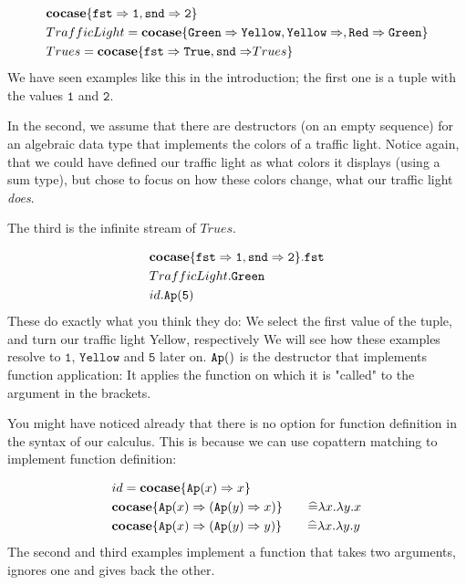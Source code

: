 \documentclass[twoside,12pt,a4paper]{article}
\begin{document}
\begin{example}
    \begin{align*}
        &\textbf{cocase}\{\mathtt{fst\Rightarrow 1, snd\Rightarrow 2}\}\\
        &TrafficLight = \textbf{cocase}\{\mathtt{Green \Rightarrow Yellow, Yellow\Rightarrow, Red\Rightarrow Green}\}\\
        &Trues = \textbf{cocase}\{\mathtt{fst \Rightarrow True, snd\Rightarrow}Trues\} 
    \end{align*}
    We have seen examples like this in the introduction; the first one is a tuple with the values $\mathtt{1}$ and $\mathtt{2}$.

    In the second, we assume that there are destructors (on an empty sequence) for an algebraic data type that implements the colors of a traffic light.
    Notice again, that we could have defined our traffic light as what colors it displays (using a sum type), but chose to focus on how these colors change, 
    what our traffic light \textit{does}.

    The third is the infinite stream of $Trues$.
\end{example}

\begin{example}
    \begin{align*}
        &\textbf{cocase}\{\mathtt{fst\Rightarrow 1, snd\Rightarrow 2}\}.\mathtt{fst}\\
        &TrafficLight.\mathtt{Green}\\
        &id.\texttt{Ap}(\mathtt{5})
    \end{align*}
    These do exactly what you think they do: We select the first value of the tuple,
    and turn our traffic light Yellow, respectively 
    We will see how these examples resolve to $\mathtt{1}$, $\mathtt{Yellow}$ and $\mathtt{5}$ later on. %
    $\texttt{Ap}()$ is the destructor that implements function application: It applies the function on which it is "called" to the argument in the brackets.
\end{example} 

You might have noticed already that there is no option for function definition in the syntax of our calculus.
This is because we can use copattern matching to implement function definition:
\begin{example}
    \begin{align*}
        &id = \excopatmatch{\Ap{x}\Rightarrow x}\\
        &\excopatmatch{\Ap{x}\Rightarrow (\Ap{y}\Rightarrow x)} \tag*{$\widehat{=}\lambda x.\lambda y.x$} \\
        &\excopatmatch{\Ap{x}\Rightarrow (\Ap{y}\Rightarrow y)} \tag*{$\widehat{=}\lambda x.\lambda y.y$}
    \end{align*}
    The second and third examples implement a function that takes two arguments, ignores one and gives back the other.
\end{example}
\end{document}
